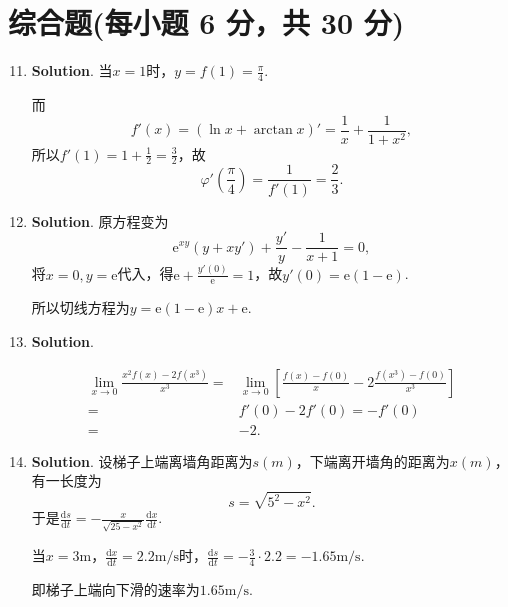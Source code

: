 \documentclass[../main.tex]{subfiles}
\begin{document}
\section{综合题(每小题 6 分，共 30 分)}
\begin{enumerate}
    \setcounter{enumi}{10}
    \item \textbf{Solution}. 当$x=1$时，$y=f(1)=\frac{\pi}{4}$.

          而
          \[
              f'(x)=\left(\ln x+\arctan x\right)'=\frac{1}{x}+\frac{1}{1+x^{2}},
          \]
          所以$f'(1)=1+\frac{1}{2}=\frac{3}{2}$，故
          \[
              \varphi'\left(\frac{\pi}{4}\right)=\frac{1}{f'(1)}=\frac{2}{3}.
          \]

    \item \textbf{Solution}. 原方程变为
          \[
              \mathrm{e}^{xy}(y+xy')+\frac{y'}{y}-\frac{1}{x+1}=0,
          \]
          将$x=0,y=\mathrm{e}$代入，得$\mathrm{e}+\frac{y'(0)}{\mathrm{e}}=1$，故$y'(
              0)=\mathrm{e}(1-\mathrm{e})$.

          所以切线方程为$y=\mathrm{e}(1-\mathrm{e})x+\mathrm{e}$.

    \item \textbf{Solution}.

          \[
              \begin{aligned}
                  \lim_{x\to0}\frac{x^2f(x)-2f(x^3)}{x^3}= {} & \lim_{x\to0}\left[\frac{f(x)-f(0)}{x}-2\frac{f(x^3)-f(0)}{x^3}\right] \\
                  = {}                                        & f'(0)-2f'(0)=-f'(0)                                                   \\
                  = {}                                        & -2.
              \end{aligned}
          \]

    \item \textbf{Solution}. 设梯子上端离墙角距离为$s(m)$，下端离开墙角的距离为$x
              (m)$，有一长度为
          \[
              s=\sqrt{5^{2}-x^{2}}.
          \]
          于是$\frac{\mathrm{d}s}{\mathrm{d}t}=-\frac{x}{\sqrt{25-x^{2}}}\frac{\mathrm{d}x}{\mathrm{d}t}$.

          当$x=3\mathrm{m}$，$\frac{\mathrm{d}x}{\mathrm{d}t}=2.2\mathrm{m/s}$时，$\frac{\mathrm{d}s}{\mathrm{d}t}
              =-\frac{3}{4}\cdot2.2=-1.65\mathrm{m/s}$.

          即梯子上端向下滑的速率为$1.65\mathrm{m/s}$.


\end{enumerate}
\end{document}
